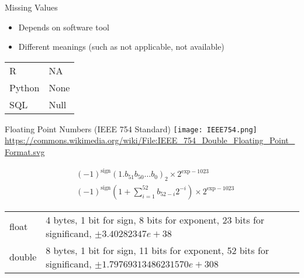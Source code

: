 \documentclass[ignorenonframetext,xcolor=x11names]{beamer}
\begin{document}
\begin{frame}{Missing Values}
\begin{itemize}
	\item Depends on software tool
	\item Different meanings (such as not applicable, not available)
\end{itemize}

\centering
\vspace{5mm}
\renewcommand{\arraystretch}{1.25}

\begin{tabular}{l|l} \hline
R &	NA \\
Python & None \\
SQL & Null \\ \hline
\end{tabular}
\end{frame}

\begin{frame}{Floating Point Numbers (IEEE 754 Standard)}
\texttt{[image: IEEE754.png]}
\tiny
\url{https://commons.wikimedia.org/wiki/File:IEEE_754_Double_Floating_Point_Format.svg}
\normalsize

\begin{align*}
& (-1)^{\text{sign}} ( 1.b_{51}b_{50} \ldots b_0)_2 \times 2^{\text{exp}-1023} \\
& (-1)^{\text{sign}} \left( 1 + \sum_{i=1}^{52} b_{52-i}2^{-i} \right) \times 2^{\text{exp}-1023}
\end{align*}

\footnotesize
\renewcommand{\arraystretch}{1.25}

\begin{tabularx}{\textwidth}{l|X} \hline
float			& 4 bytes, 1 bit for sign, 8 bits for exponent, 23 bits for significand, $\pm 3.40282347e+38$ \\
double			& 8 bytes, 1 bit for sign, 11 bits for exponent, 52 bits for significand, $\pm 1.79769313486231570e+308$ \\ \hline
\end{tabularx}
\end{frame}
\end{document}
